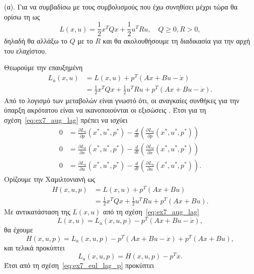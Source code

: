\begin{solution}
    (α). Για να συμβαδίσω με τους συμβολισμούς που έχω συνηθίσει μέχρι τώρα θα ορίσω
    τη  ως
    \[
        L(x, u) = \frac{1}{2}x^{T}Qx + \frac{1}{2}u^{T}Ru, \quad Q \geq
        0, R > 0,
    \]
    δηλαδή θα αλλάξω το \( Q \) με το \( R \) και θα ακολουθήσουμε τη διαδικασία
    για την αρχή του ελαχίστου.

    Θεωρούμε την επαυξημένη 
    \begin{align}\label{eq:ex7_aug_lag}
        L_a(x, u) &= L(x, u) + p^T\left( Ax + Bu - \dot{x} \right) \nonumber \\
        &= \frac{1}{2}x^{T}Qx + \frac{1}{2}u^{T}Ru + p^T\left( Ax + Bu - \dot{x}
        \right).
    \end{align}
    Από το λογισμό των μεταβολών είναι γνωστό ότι, οι αναγκαίες συνθήκες για την
    ύπαρξη ακρότατου είναι να ικανοποιούνται οι εξισώσεις .
    Έτσι για τη σχέση~\eqref{eq:ex7_aug_lag} πρέπει να ισχύει
    \begin{align}
        0 &= \frac{\partial L_a}{\partial p}(x^*, u^*, p^*) -
        \frac{d}{dt}\left(
        \frac{\partial L_a}{\partial \dot{p}}(x^*, u^*, p^*)\right)
        \label{eq:ex7_eul_lag_p}\\
        0 &= \frac{\partial L_a}{\partial x}(x^*, u^*, p^*) -
        \frac{d}{dt}\left(
        \frac{\partial L_a}{\partial \dot{x}}(x^*, u^*, p^*)\right)
        \label{eq:ex7_eul_lag_x}\\
        0 &= \frac{\partial L_a}{\partial u}(x^*, u^*, p^*) -
        \frac{d}{dt}\left(
        \frac{\partial L_a}{\partial \dot{u}}(x^*, u^*, p^*)\right).
        \label{eq:ex7_eul_lag_u}
    \end{align}
    Ορίζουμε την Χαμιλτονιανή ως
    \begin{align}\label{eq:ex7_hamilton}
        H(x, u, p) &= L(x, u) + p^T\left(Ax + Bu\right) \nonumber \\
        &= \frac{1}{2}x^{T}Qx + \frac{1}{2}u^{T}Ru + p^T\left( Ax + Bu \right).
    \end{align}
    Με αντικατάσταση της \( L(x, u) \) από τη σχέση~\eqref{eq:ex7_aug_lag}
    \[
        L(x ,u) = L_a(x, u, p) - p^T\left(Ax + Bu - \dot{x} \right),
    \]
    θα έχουμε
    \[
        H(x, u, p) = L_a(x, u, p) - p^T\left( Ax + Bu - \dot{x} \right)
        + p^T\left( Ax + Bu \right),
    \]
    και τελικά προκύπτει
    \[
        L_a(x, u, p) = H(x, u, p) - p^{T}\dot{x}.
    \]
    Έτσι από τη σχέση~\eqref{eq:ex7_eul_lag_p} προκύπτει

\end{solution}
